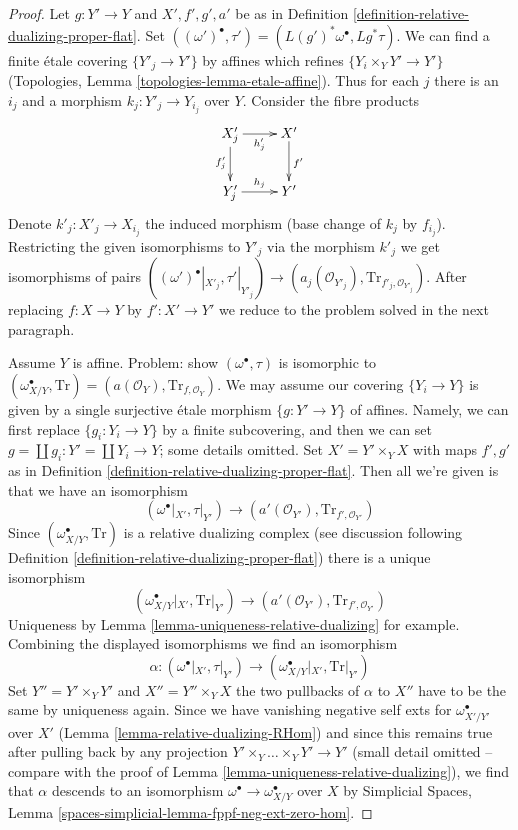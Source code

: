\documentclass[10pt,a4paper]{amsart}
\theoremstyle{plain}
\theoremstyle{definition}
\theoremstyle{remark}
\numberwithin{equation}{subsection}
\begin{document}
\begin{proof}
Let $g : Y' \to Y$ and $X', f', g', a'$ be as in
Definition \ref{definition-relative-dualizing-proper-flat}.
Set $((\omega')^\bullet, \tau') = (L(g')^*\omega^\bullet, Lg^*\tau)$.
We can find a finite \'etale covering
$\{Y'_j \to Y'\}$ by affines which refines $\{Y_i \times_Y Y' \to Y'\}$
(Topologies, Lemma \ref{topologies-lemma-etale-affine}).
Thus for each $j$ there is an $i_j$ and a morphism
$k_j : Y'_j \to Y_{i_j}$ over $Y$. Consider the fibre products
$$
\xymatrix{
X'_j \ar[r]_{h_j'} \ar[d]_{f'_j} &
X' \ar[d]^{f'} \\
Y'_j \ar[r]^{h_j} & Y'
}
$$
Denote $k'_j : X'_j \to X_{i_j}$ the induced morphism (base change
of $k_j$ by $f_{i_j}$). Restricting the given isomorphisms to $Y'_j$
via the morphism $k'_j$ we get isomorphisms of pairs
$((\omega')^\bullet|_{X'_j}, \tau'|_{Y'_j})
\to (a_j(\mathcal{O}_{Y'_j}), \text{Tr}_{f'_j, \mathcal{O}_{Y'_j}})$.
After replacing $f : X \to Y$ by $f' : X' \to Y'$ we reduce to the
problem solved in the next paragraph.

\medskip\noindent
Assume $Y$ is affine. Problem: show $(\omega^\bullet, \tau)$ is
isomorphic to $(\omega_{X/Y}^\bullet, \text{Tr}) =
(a(\mathcal{O}_Y), \text{Tr}_{f, \mathcal{O}_Y})$.
We may assume our covering $\{Y_i \to Y\}$ is given by a single
surjective \'etale morphism $\{g : Y' \to Y\}$ of affines.
Namely, we can first replace $\{g_i: Y_i \to Y\}$ by a finite
subcovering, and then we can set $g = \coprod g_i :  Y' = \coprod Y_i \to Y$;
some details omitted. Set $X' = Y' \times_Y X$ with maps
$f', g'$ as in Definition \ref{definition-relative-dualizing-proper-flat}.
Then all we're given is that we have an isomorphism
$$
(\omega^\bullet|_{X'}, \tau|_{Y'}) \to
(a'(\mathcal{O}_{Y'}), \text{Tr}_{f', \mathcal{O}_{Y'}})
$$
Since $(\omega_{X/Y}^\bullet, \text{Tr})$ is a relative dualizing complex
(see discussion following
Definition \ref{definition-relative-dualizing-proper-flat})
there is a unique isomorphism
$$
(\omega_{X/Y}^\bullet|_{X'}, \text{Tr}|_{Y'}) \to
(a'(\mathcal{O}_{Y'}), \text{Tr}_{f', \mathcal{O}_{Y'}})
$$
Uniqueness by Lemma \ref{lemma-uniqueness-relative-dualizing} for example.
Combining the displayed isomorphisms we find an isomorphism
$$
\alpha :
(\omega^\bullet|_{X'}, \tau|_{Y'}) \to
(\omega_{X/Y}^\bullet|_{X'}, \text{Tr}|_{Y'})
$$
Set $Y'' = Y' \times_Y Y'$ and $X'' = Y'' \times_Y X$ the two
pullbacks of $\alpha$ to $X''$ have to be the same by uniqueness again.
Since we have vanishing negative self exts for
$\omega_{X'/Y'}^\bullet$ over $X'$ (Lemma \ref{lemma-relative-dualizing-RHom})
and since this remains true after pulling back by any projection
$Y' \times_Y \ldots \times_Y Y' \to Y'$ (small detail omitted -- compare
with the proof of Lemma \ref{lemma-uniqueness-relative-dualizing}),
we find that $\alpha$ descends to an isomorphism
$\omega^\bullet \to \omega_{X/Y}^\bullet$
over $X$ by Simplicial Spaces, Lemma
\ref{spaces-simplicial-lemma-fppf-neg-ext-zero-hom}.
\end{proof}
\end{document}
